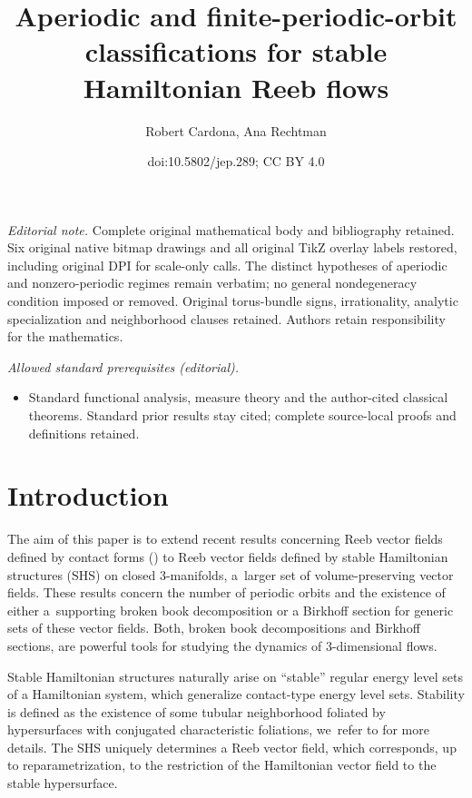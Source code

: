 \documentclass[10pt]{amsart}
\title{Aperiodic and finite-periodic-orbit classifications for stable Hamiltonian Reeb flows}
\author{Robert Cardona, Ana Rechtman}
\date{doi:10.5802/jep.289; CC BY 4.0}
\newcommand{\threemanifolds}{$3$\nobreakdash-mani\-folds\xspace}
\theoremstyle{definition}
\providecommand{\mainmatter}{}\providecommand{\backmatter}{}
\begin{document}
\maketitle
\noindent\textit{Editorial note.} Complete original mathematical body and bibliography retained. Six original native bitmap drawings and all original TikZ overlay labels restored, including original DPI for scale-only calls. The distinct hypotheses of aperiodic and nonzero-periodic regimes remain verbatim; no general nondegeneracy condition imposed or removed. Original torus-bundle signs, irrationality, analytic specialization and neighborhood clauses retained. Authors retain responsibility for the mathematics.\par\medskip
\noindent\textit{Allowed standard prerequisites (editorial).}\begin{itemize}
\item Standard functional analysis, measure theory and the author-cited classical theorems. Standard prior results stay cited; complete source-local proofs and definitions retained.
\end{itemize}\medskip
\vspace*{-\baselineskip}
\tableofcontents
\mainmatter

\vspace*{-3.4\baselineskip}\mbox{}
\section{Introduction}\label{sec:intro}

The aim of this paper is to extend recent results concerning Reeb vector fields defined by contact forms (\cite{CDR,CDHR,CM}) to Reeb vector fields defined by stable Hamiltonian structures (SHS) on closed \threemanifolds, a~larger set of volume-preserving vector fields. These results concern the number of periodic orbits and the existence of either a~supporting broken book decomposition or a Birkhoff section for generic sets of these vector fields. Both, broken book decompositions and Birkhoff sections, are powerful tools for studying the dynamics of 3-dimensional flows.

Stable Hamiltonian structures naturally arise on ``stable'' regular energy level sets of a Hamiltonian system, which generalize contact-type energy level sets. Stability is defined as the existence of some tubular neighborhood foliated by hypersurfaces with conjugated characteristic foliations, we~refer to \cite{HZ,CV1} for more details. The SHS uniquely determines a Reeb vector field, which corresponds, up to reparametrization, to the restriction of the Hamiltonian vector field to the stable hypersurface.
\end{document}

